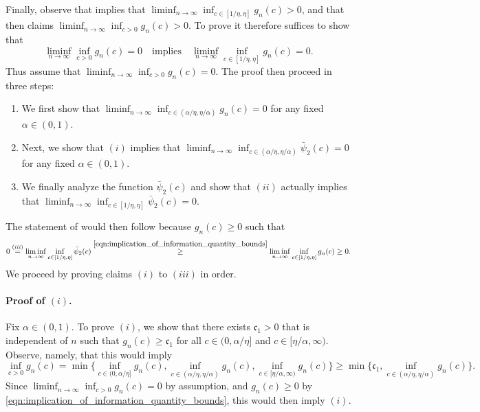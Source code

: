 \documentclass[11pt]{article}
\newcommand{\mf}[1]{\mathfrak{#1}}
\theoremstyle{definition}
\theoremstyle{definition}
\begin{document}
Finally, observe that  implies that $\liminf_{n\rightarrow\infty} \inf_{c\in[1/\eta,\eta]}g_n(c)>0$, and that  then claims $\liminf_{n\rightarrow\infty} \inf_{c>0}g_n(c)>0$.
To prove  it therefore suffices to show that
\begin{equation}
	\liminf_{n\rightarrow\infty}\allowbreak \inf_{c>0}g_n(c)=0
	\quad
	\mathrm{implies}
	\quad
	\liminf_{n\rightarrow\infty}\allowbreak\inf_{c\in[1/\eta,\eta]}\allowbreak g_n(c)=0
	.
\end{equation}
Thus assume that $\liminf_{n\rightarrow\infty}\allowbreak \inf_{c>0}\allowbreak g_n(c)=0$.
The proof then proceed in three steps:
\begin{enumerate}
	\item[$(i)$] We first show that $\liminf_{n\rightarrow\infty} \inf_{c\in (\alpha/\eta,\eta/\alpha)}g_n(c)=0$ for any fixed $\alpha \in (0,1)$.
	\item[$(ii)$] Next, we show that $(i)$ implies that $\liminf_{n\rightarrow \infty}\allowbreak\inf_{c\in (\alpha/\eta,\eta/\alpha)}\bar{\psi}_2(c)=0$ for any fixed $\alpha\in(0,1)$.
	\item[$(iii)$] We finally analyze the function $\bar{\psi}_2(c)$ and show that $(ii)$ actually implies that $\liminf_{n\rightarrow\infty}\allowbreak\inf_{c\in [1/\eta,\eta]}\allowbreak\bar{\psi}_2(c)=0$.
\end{enumerate}
The statement of  would then follow because $g_n(c)\geq 0$ such that
\begin{equation}
	0
	\overset{(iii)}{=}
	\liminf_{n\rightarrow \infty}\inf_{c\in [1/\eta,\eta]}\bar{\psi}_2(c)
	\overset{\eqref{eqn:implication_of_information_quantity_bounds}}{\geq}
	\liminf_{n\rightarrow\infty}\inf_{c\in [1/\eta,\eta]}g_n(c)
	\geq
	0
	.
\end{equation}
We proceed by proving claims $(i)$ to $(iii)$ in order.

\paragraph*{Proof of $(i)$.}
Fix $\alpha\in (0,1)$.
To prove $(i)$, we show that there exists $\mf{c}_1>0$ that is independent of $n$ such that $g_n(c)\geq \mf{c}_1$ for all $c\in(0,\alpha/\eta]$ and $c\in[\eta/\alpha,\infty)$.
Observe, namely, that this would imply
\begin{equation}
	\inf_{c>0}g_n(c)
	=
	\min\biggl\{\inf_{c\in (0,\alpha/\eta]}g_n(c), \inf_{c\in(\alpha/\eta,\eta/\alpha)}g_n(c),  \inf_{c\in [\eta/\alpha,\infty)}g_n(c)\biggr\}
	\geq
	\min\biggl\{\mf{c}_1,  \inf_{c\in(\alpha/\eta,\eta/\alpha)}g_n(c)\biggr\}
	.
\end{equation}
Since $\liminf_{n\rightarrow \infty}\inf_{c>0}g_n(c)=0$ by assumption, and $g_n(c)\geq0$ by \eqref{eqn:implication_of_information_quantity_bounds}, this would then imply $(i)$.
\end{document}
